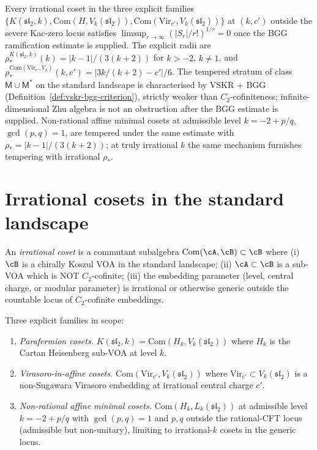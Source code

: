 Every irrational coset in the three explicit families
$\{K(\mathfrak{sl}_2, k), \mathrm{Com}(H, V_k(\mathfrak{sl}_2)),
\mathrm{Com}(\mathrm{Vir}_{c'}, V_k(\mathfrak{sl}_2))\}$ at $(k, c')$
outside the severe Kac-zero locus satisfies
$\limsup_{r \to \infty} (\lvert S_r \rvert / r!)^{1/r} = 0$ once the
BGG ramification estimate is supplied. The explicit radii are
$\rho_*^{K(\mathfrak{sl}_2, k)}(k) = \lvert k - 1 \rvert / (3 (k + 2))$
for $k > -2$, $k \neq 1$, and
$\rho_*^{\mathrm{Com}(\mathrm{Vir}_{c'}, V_k)}(k, c') =
\lvert 3 k / (k + 2) - c' \rvert / 6$. The tempered stratum of class
$\mathsf{M} \cup \mathsf{M}^*$ on the standard landscape is
characterised by VSKR + BGG (Definition~\ref{def:vskr-bgg-criterion}),
strictly weaker than $C_2$-cofiniteness; infinite-dimensional Zhu
algebra is not an obstruction after the BGG estimate is supplied.
Non-rational affine minimal cosets at admissible level
$k = -2 + p/q$, $\gcd(p, q) = 1$, are tempered under the same estimate
with
$\rho_* = \lvert k-1 \rvert / (3(k+2))$; at truly irrational $k$ the
same mechanism furnishes tempering with irrational $\rho_*$.

\section{Irrational cosets in the standard landscape}
\label{sec:irrational-cosets-definitions}

\begin{definition}
\label{def:irrational-coset-standard-landscape}
An \emph{irrational coset} is a commutant subalgebra
$\mathrm{Com}(\cA, \cB) \subset \cB$ where (i) $\cB$ is a chirally
Koszul VOA in the standard landscape; (ii) $\cA \subset \cB$ is a
sub-VOA which is NOT $C_2$-cofinite; (iii) the embedding parameter
(level, central charge, or modular parameter) is irrational or
otherwise generic outside the countable locus of $C_2$-cofinite
embeddings.

Three explicit families in scope:
\begin{enumerate}[nosep]
\item \emph{Parafermion cosets.}
 $K(\mathfrak{sl}_2, k)
 = \mathrm{Com}(H_k, V_k(\mathfrak{sl}_2))$
 where $H_k$ is the Cartan Heisenberg sub-VOA at level $k$.
\item \emph{Virasoro-in-affine cosets.}
 $\mathrm{Com}(\mathrm{Vir}_{c'}, V_k(\mathfrak{sl}_2))$ where
 $\mathrm{Vir}_{c'} \subset V_k(\mathfrak{sl}_2)$ is a non-Sugawara
 Virasoro embedding at irrational central charge $c'$.
\item \emph{Non-rational affine minimal cosets.}
 $\mathrm{Com}(H_k, L_k(\mathfrak{sl}_2))$ at admissible level
 $k = -2 + p/q$ with $\gcd(p, q) = 1$ and $p, q$ outside the
 rational-CFT locus (admissible but non-unitary), limiting to
 irrational-$k$ cosets in the generic locus.
\end{enumerate}
\end{definition}


